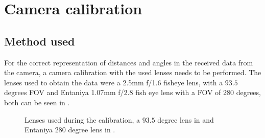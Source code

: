 
\chapter{Camera calibration\label{chap:calib}}

\section{Method used}

For the correct representation of distances and angles in the received data from the camera, a camera calibration with the used lenses needs to be performed.
The lenses used to obtain the data were a 2.5mm f/1.6 fisheye lens, with a $93.5$ degrees \ac{FOV} and Entaniya 1.07mm f/2.8 fish eye lens with a FOV 
of $280$ degrees, both can be seen in .

\begin{figure}[H]
	\centering
	\caption{
		Lenses used during the calibration, a $93.5$ degree lens in  and Entaniya $280$ degree lens in .
  }
	\label{fig:lenses}
\end{figure}


